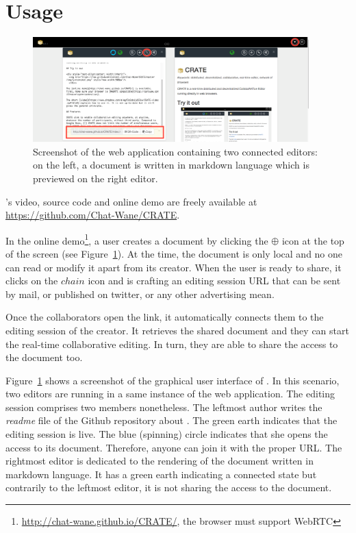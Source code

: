 
\section{Usage}
\label{sec:usage}

\begin{figure}
  \centering
  \includegraphics[width=0.95\textwidth]{./img/crate.png}
  \caption{\label{img:screenshot} Screenshot of the web application containing
    two connected editors: on the left, a document is written in markdown
    language which is previewed on the right editor.}
\end{figure}

\CRATE's video, source code and online demo are freely available at
\url{https://github.com/Chat-Wane/CRATE}.


In the online demo\footnote{\url{http://chat-wane.github.io/CRATE/}, the browser
  must support WebRTC}, a user creates a document by clicking the $\oplus$ icon
at the top of the screen (see Figure~\ref{img:screenshot}). At the time, the
document is only local and no one can read or modify it apart from its
creator. When the user is ready to share, it clicks on the $chain$ icon and
\CRATE is crafting an editing session URL that can be sent by mail, or published
on twitter, or any other advertising mean.

Once the collaborators open the link, it automatically connects them
to the editing session of the creator. It retrieves the shared
document and they can start the real-time collaborative editing. In
turn, they are able to share the access to the document too. 

Figure~\ref{img:screenshot} shows a screenshot of the graphical user interface
of \CRATE. In this scenario, two editors are running in a same instance of the
web application. The editing session comprises two members nonetheless. The
leftmost author writes the \emph{readme} file of the Github repository about
\CRATE. The green earth indicates that the editing session is live. The blue
(spinning) circle indicates that she opens the access to its document. Therefore,
anyone can join it with the proper URL. The rightmost editor is dedicated to the
rendering of the document written in markdown language. It has a green earth
indicating a connected state but contrarily to the leftmost editor, it is not
sharing the access to the document.

